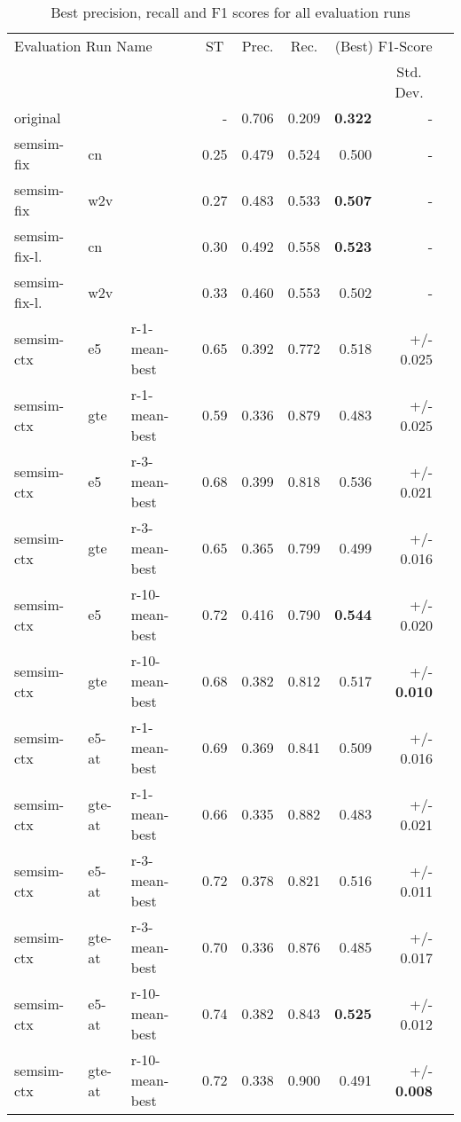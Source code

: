 \documentclass[11pt]{scrreprt}
\begin{document}
\begin{table}
\centering
\begin{tabular}{lllrrrrrr}
\toprule
\multicolumn{3}{l}{Evaluation Run Name}	& \multicolumn{1}{c}{ST} & \multicolumn{1}{c}{Prec.} & \multicolumn{1}{c}{Rec.} & \multicolumn{2}{c}{(Best) F1-Score}\\
\cmidrule{7-8}
\multicolumn{7}{l}{} & \multicolumn{1}{c}{Std. Dev.} \\
\midrule
original &  &  & - & 0.706 & 0.209 & \textbf{0.322} & - \\
\hline
semsim-fix & cn &  & 0.25 & 0.479 & 0.524 & 0.500 & - \\
semsim-fix & w2v &  & 0.27 & 0.483 & 0.533 & \textbf{0.507} & - \\
\hline
semsim-fix-l. & cn &  & 0.30 & 0.492 & 0.558 & \textbf{0.523} & - \\
semsim-fix-l. & w2v &  & 0.33 & 0.460 & 0.553 & 0.502 & - \\
\hline
semsim-ctx & e5 & r-1-mean-best & 0.65 & 0.392 & 0.772 & 0.518 & +/- 0.025 \\
semsim-ctx & gte & r-1-mean-best & 0.59 & 0.336 & 0.879 & 0.483 & +/- 0.025 \\
semsim-ctx & e5 & r-3-mean-best & 0.68 & 0.399 & 0.818 & 0.536 & +/- 0.021 \\
semsim-ctx & gte & r-3-mean-best & 0.65 & 0.365 & 0.799 & 0.499 & +/- 0.016 \\
semsim-ctx & e5 & r-10-mean-best & 0.72 & 0.416 & 0.790 & \textbf{0.544} & +/- 0.020 \\
semsim-ctx & gte & r-10-mean-best & 0.68 & 0.382 & 0.812 & 0.517 & +/- \textbf{0.010} \\

\hline
semsim-ctx & e5-at & r-1-mean-best & 0.69 & 0.369 & 0.841 & 0.509 & +/- 0.016 \\
semsim-ctx & gte-at & r-1-mean-best & 0.66 & 0.335 & 0.882 & 0.483 & +/- 0.021 \\
semsim-ctx & e5-at & r-3-mean-best & 0.72 & 0.378 & 0.821 & 0.516 & +/- 0.011 \\
semsim-ctx & gte-at & r-3-mean-best & 0.70 & 0.336 & 0.876 & 0.485 & +/- 0.017 \\
semsim-ctx & e5-at & r-10-mean-best & 0.74 & 0.382 & 0.843 & \textbf{0.525} & +/- 0.012 \\
semsim-ctx & gte-at & r-10-mean-best & 0.72 & 0.338 & 0.900 & 0.491 & +/- \textbf{0.008} \\
\bottomrule
\end{tabular}
\caption{Best precision, recall and F1 scores for all evaluation runs}
\label{tab:quant-results}
\end{table}
\end{document}
